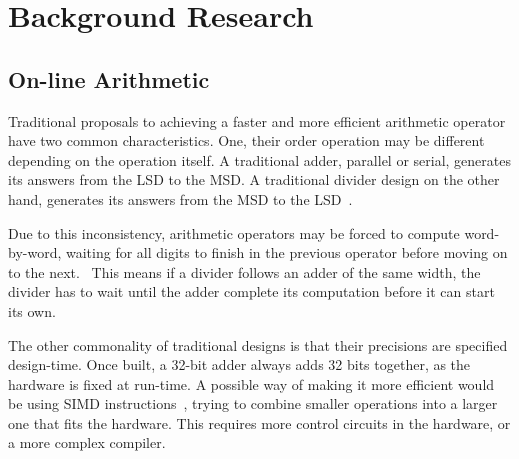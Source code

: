 \documentclass[journal]{IEEEtran}
\begin{document}
\section{Background Research}

\subsection{On-line Arithmetic}
Traditional proposals to achieving a faster and more efficient arithmetic
operator have two common characteristics.
One, their order operation may be different depending on the operation itself.
A traditional adder, parallel or serial, generates its answers from the LSD to
the MSD.
A traditional divider design on the other hand, generates its answers from
the MSD to the LSD~\cite{Brent1}\cite{Srinivas1}.

Due to this inconsistency, arithmetic operators may be forced to compute
word-by-word, waiting for all digits to finish in the previous operator before
moving on to the next.~\cite{Zhao1}
This means if a divider follows an adder of the same width, the divider has to
wait until the adder complete its computation before it can start its own.

The other commonality of traditional designs is that their precisions are
specified design-time. Once built, a 32-bit adder always adds 32 bits together,
as the hardware is fixed at run-time.
A possible way of making it more efficient would be using SIMD
instructions~\cite{Duncan1}, trying to combine smaller operations into a larger
one that fits the hardware.
This requires more control circuits in the hardware, or a more complex compiler.
\end{document}

